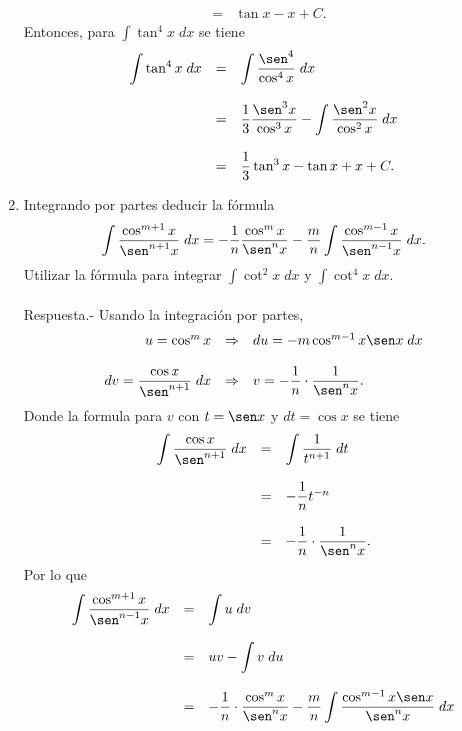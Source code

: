 \begin{enumerate}[\bfseries 1.]
$$\begin{array}{rcl}
	    &=& \tan x - x + C.
	\end{array}
	$$
	Entonces, para $\int \tan^4 x\; dx$ se tiene
	$$
	\begin{array}{rcl}
	    \displaystyle\int \tan^4 x \; dx &=& \displaystyle\int \dfrac{\sen^4}{\cos^4 x}\; dx\\\\
	    &=& \dfrac{1}{3}\dfrac{\sen^3 x}{\cos^3 x} - \displaystyle\int \dfrac{\sen^2 x}{\cos^2 x}\; dx\\\\
	    &=& \dfrac{1}{3}\tan^3 x - \tan x + x + C.
	\end{array}
	$$
	\vspace{.5cm}

    \item Integrando por partes deducir la fórmula
    $$\int \dfrac{\cos^{m+1}x}{\sen^{n+1}x}\; dx = -\dfrac{1}{n}\dfrac{\cos^m x}{\sen^n x}-\dfrac{m}{n}\int \dfrac{\cos^{m-1}x}{\sen^{n-1}x}\; dx.$$
    Utilizar la fórmula para integrar $\int \cot^2 x \; dx$ y $\int \cot^4 x\; dx$.\\\\
    	Respuesta.-\; Usando la integración por partes,
	$$
	\begin{array}{rcl}
	    u=\cos^m x &\Rightarrow& du=-m\cos^{m-1} x\sen x\; dx\\\\
	    dv=\dfrac{\cos x}{\sen^{n+1}}\; dx & \Rightarrow & v=-\dfrac{1}{n}\cdot \dfrac{1}{\sen^n x}.
	\end{array}
	$$
	Donde la formula para $v$ con $t=\sen x$ y $dt=\cos x$ se tiene
	$$
	\begin{array}{rcl}
	    \displaystyle\int \dfrac{\cos x}{\sen^{n+1}}\; dx &=& \displaystyle\int \dfrac{1}{t^{n+1}}\; dt\\\\
	    &=& -\dfrac{1}{n}t^{-n}\\\\
	    &=& -\dfrac{1}{n}\cdot \dfrac{1}{\sen^n x}.
	\end{array}
	$$
	Por lo que
	$$
	\begin{array}{rcl}
	    \displaystyle\int \dfrac{\cos^{m+1}x}{\sen^{n-1}x}\; dx &=& \displaystyle\int u \; dv\\\\
	    &=& uv - \displaystyle\int v\; du\\\\
	    &=& -\dfrac{1}{n}\cdot \dfrac{\cos^m x}{\sen^n x}-\dfrac{m}{n}\displaystyle\int \dfrac{\cos^{m-1}x\sen x}{\sen^n x}\; dx\\\\

\end{array}$$
\end{enumerate}
